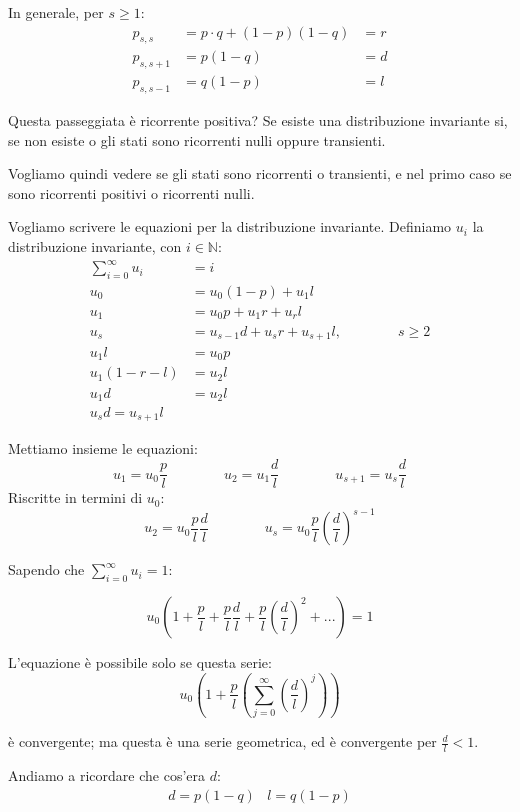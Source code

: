 \documentclass[a4paper,12pt]{book}
\begin{document}
In generale, per $ s \ge 1 $:
\begin{align*}
	p_{s,s} & = p\cdot q + (1-p) (1-q) & = r \\
	p_{s,s+1} & = p(1-q) & = d \\
	p_{s,s-1} & = q(1-p) & = l
\end{align*}

Questa passeggiata è ricorrente positiva? Se esiste una distribuzione invariante si, se non esiste o gli stati sono ricorrenti nulli oppure transienti. 


Vogliamo quindi vedere se gli stati sono ricorrenti o transienti, e nel primo caso se sono ricorrenti positivi o ricorrenti nulli. 

Vogliamo scrivere le equazioni per la distribuzione invariante. Definiamo $ u_i $ la distribuzione invariante, con $ i \in \mathbb{N} $:
\begin{align*}
	\sum_{i=0}^{\infty} u_i & = i \\
	u_0 & = u_0(1-p) + u_1 l \\
	u_1 & = u_0 p + u_1 r + u_r l \\
	u_s & = u_{s-1}d + u_s r + u_{s+1} l, \qquad \qquad s \ge 2 \\
	u_1 l & = u_0 p \\
	u_1(1-r-l) & = u_2 l \\
	u_1 d & = u_2 l \\	
	u_s d = u_{s+1} l
\end{align*}

Mettiamo insieme le equazioni:
$$ u_1 = u_0 \frac{p}{l} \qquad \qquad u_2 = u_1\frac{d}{l} \qquad \qquad u_{s+1} = u_s \frac{d}{l} $$
Riscritte in termini di $ u_0 $:
$$ u_2 = u_0 \frac{p}{l}\frac{d}{l} \qquad \qquad u_s = u_0 \frac{p}{l} \left(\frac{d}{l}\right)^{s-1} $$

Sapendo che $ \sum_{i=0}^{\infty} u_i = 1 $:

$$ u_0 \left( 1 + \frac{p}{l} + \frac{p}{l}\frac{d}{l} + \frac{p}{l} \left(\frac{d}{l}\right)^2 + ... \right) = 1 $$



L'equazione è possibile solo se questa serie:
$$ u_0 \left(1 + \frac{p}{l} \left( \sum_{j=0}^{\infty} \left(\frac{d}{l}\right)^j\right)\right) $$

è convergente; ma questa è una serie geometrica, ed è convergente per $ \frac{d}{l} < 1 $.

Andiamo a ricordare che cos'era $ d $:
$$ \begin{array}{cc}
d = p(1-q) & l = q(1-p) \end{array} $$
\end{document}
